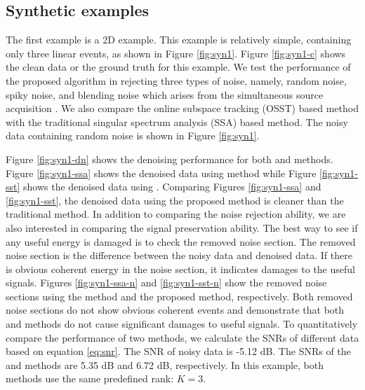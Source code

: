 \subsection{Synthetic examples}
The first example is a 2D example. This example is relatively simple, containing only three linear events, as shown in Figure \ref{fig:syn1}. Figure \ref{fig:syn1-c} shows the clean data or the ground truth for this example. We test the performance of the proposed algorithm in rejecting three types of noise, namely, random noise, spiky noise, and blending noise which arises from the simultaneous source acquisition \cite[]{shaohuan2016}. We also compare the online subspace tracking (OSST) based method with the traditional singular spectrum analysis (SSA) based method. The noisy data containing  random noise is shown in Figure \ref{fig:syn1}. 

Figure \ref{fig:syn1-dn} shows the denoising performance for both  and  methods. Figure \ref{fig:syn1-ssa} shows the denoised data using  method while Figure \ref{fig:syn1-sst} shows the denoised data using . Comparing Figures \ref{fig:syn1-ssa} and \ref{fig:syn1-sst}, the denoised data using the proposed method is cleaner than the traditional  method. In addition to comparing the noise rejection ability, we are also interested in comparing the signal preservation ability. The best way to see if any useful energy is damaged is to check the removed noise section. The removed noise section is the difference between the noisy data and denoised data. If there is obvious coherent energy in the noise section, it indicates damages to the useful signals. Figures \ref{fig:syn1-ssa-n} and \ref{fig:syn1-sst-n} show the removed noise sections using the  method and the proposed method, respectively. Both removed noise sections do not show obvious coherent events and demonstrate that both  and  methods do not cause significant damages to useful signals. To quantitatively compare the performance of two methods, we calculate the SNRs of different data based on equation \ref{eq:snr}. The SNR of noisy data is -5.12 dB. The SNRs of the  and  methods are 5.35 dB and 6.72 dB, respectively. In this example, both methods use the same predefined rank: $K=3$.

